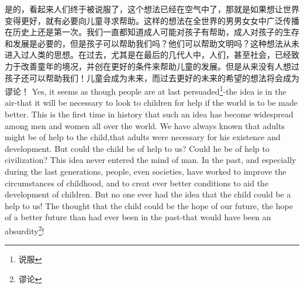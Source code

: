 \documentclass[lang=cn,10pt]{elegantbook}
\begin{document}
\begin{tcolorbox}[title=译文,
colback=red!5!white,
colframe=red!75!black,
fonttitle=\bfseries]
是的，看起来人们终于被说服了，这个想法已经在空气中了，那就是如果想让世界变得更好，就有必要向儿童寻求帮助。这样的想法在全世界的男男女女中广泛传播在历史上还是第一次。我们一直都知道成人可能对孩子有帮助，成人对孩子的生存和发展是必要的，但是孩子可以帮助我们吗？他们可以帮助文明吗？这种想法从未进入过人类的思想。在过去，尤其是在最后的几代人中，人们，甚至社会，已经致力于改善童年的境况，并创在更好的条件来帮助儿童的发展。但是从来没有人想过孩子还可以帮助我们！儿童会成为未来，而过去更好的未来的希望的想法将会成为谬论！
Yes, it seems as though people are at last persuaded\footnote{说服}-the idea is in the air-that it will be necessary to look to children for help if the world is to be made better. This is the first time in history that such an idea has become widespread among men and women all over the world. We have always known that adults might be of help to the child,that adults were necessary for his existence and development. But could the child be of help to us? Could he be of help to civilization? This idea never entered the mind of man. In the past, and especially during the last generations, people, even societies, have worked to improve the circumstances of childhood, and to creat ever better conditions to aid the development of children. But no one ever had the idea that the child could be a help to us! The thought that the child could be the hope of our future, the hope of a better future than had ever been in the past-that would have been an absurdity\footnote{谬论}!
\end{tcolorbox}
\end{document}
